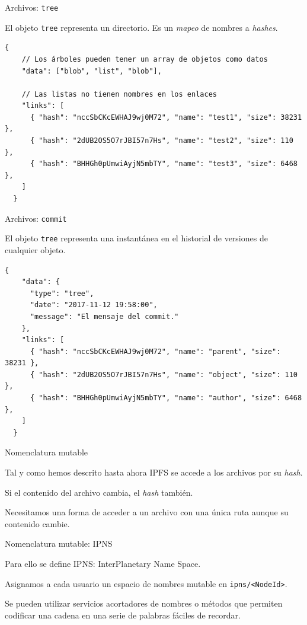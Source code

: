 \documentclass[spanish]{beamer}
\begin{document}
\begin{frame}[fragile]{Archivos: \texttt{tree}}

  El objeto \texttt{tree} representa un directorio. Es un \textit{mapeo} de nombres a \textit{hashes}.
  
  \begin{lstlisting}[caption={Estructura JSON de un \texttt{tree}.}]
  {
    // Los árboles pueden tener un array de objetos como datos
    "data": ["blob", "list", "blob"],

    // Las listas no tienen nombres en los enlaces
    "links": [
      { "hash": "nccSbCKcEWHAJ9wj0M72", "name": "test1", "size": 38231 },
      { "hash": "2dUB2OS5O7rJBI57n7Hs", "name": "test2", "size": 110 },
      { "hash": "BHHGh0pUmwiAyjN5mbTY", "name": "test3", "size": 6468 },
    ]
  }
\end{lstlisting}

\end{frame}

\begin{frame}[fragile]{Archivos: \texttt{commit}}

  El objeto \texttt{tree} representa una instantánea en el historial de versiones de cualquier objeto.
  
  \begin{lstlisting}[caption={Estructura JSON de un \texttt{commit}.}]
  {
    "data": {
      "type": "tree",
      "date": "2017-11-12 19:58:00",
      "message": "El mensaje del commit."
    },
    "links": [
      { "hash": "nccSbCKcEWHAJ9wj0M72", "name": "parent", "size": 38231 },
      { "hash": "2dUB2OS5O7rJBI57n7Hs", "name": "object", "size": 110 },
      { "hash": "BHHGh0pUmwiAyjN5mbTY", "name": "author", "size": 6468 },
    ]
  }
\end{lstlisting}

\end{frame}

\begin{frame}{Nomenclatura mutable}
  
  Tal y como hemos descrito hasta ahora IPFS se accede a los archivos por su \textit{hash}.

  Si el contenido del archivo cambia, el \textit{hash} también.

  Necesitamos una forma de acceder a un archivo con una única ruta aunque su contenido cambie.

\end{frame}

\begin{frame}{Nomenclatura mutable: IPNS}
  
  Para ello se define IPNS: InterPlanetary Name Space.

  Asignamos a cada usuario un espacio de nombres mutable en \texttt{ipns/<NodeId>}.

  Se pueden utilizar servicios acortadores de nombres o métodos que permiten codificar una cadena en una serie de palabras fáciles de recordar.

\end{frame}
\end{document}

